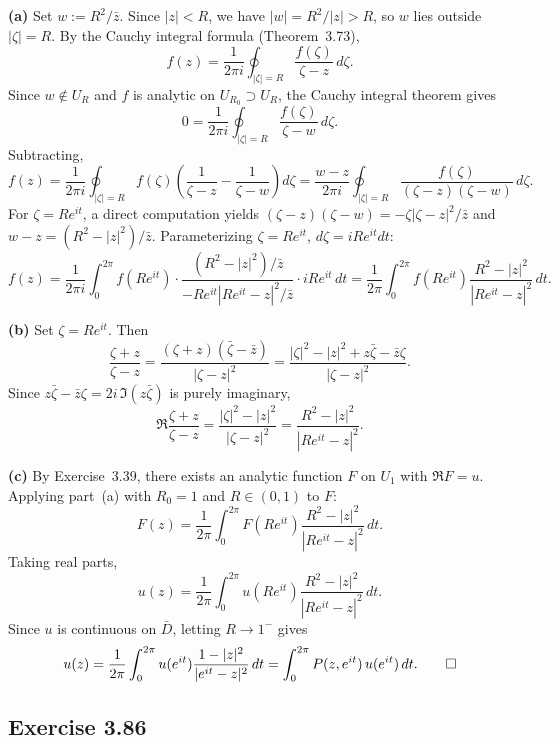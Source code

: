 \documentclass{article}
\begin{document}
\begin{solution}
  \textbf{(a)}\;
  Set $w := R^2/\bar{z}$.  Since $|z|<R$, we have
  $|w| = R^2/|z| > R$, so $w$ lies outside $|\zeta|=R$.
  By the Cauchy integral formula (Theorem~3.73),
  \[
    f(z) = \frac{1}{2\pi i}\oint_{|\zeta|=R}
    \frac{f(\zeta)}{\zeta - z}\,d\zeta.
  \]
  Since $w \notin U_R$ and $f$ is analytic on $U_{R_0}\supset U_R$,
  the Cauchy integral theorem gives
  \[
    0 = \frac{1}{2\pi i}\oint_{|\zeta|=R}
    \frac{f(\zeta)}{\zeta - w}\,d\zeta.
  \]
  Subtracting,
  \[
    f(z) = \frac{1}{2\pi i}\oint_{|\zeta|=R}f(\zeta)
    \left(\frac{1}{\zeta-z}-\frac{1}{\zeta-w}\right)d\zeta
    = \frac{w-z}{2\pi i}\oint_{|\zeta|=R}
    \frac{f(\zeta)}{(\zeta-z)(\zeta-w)}\,d\zeta.
  \]
  For $\zeta = Re^{it}$, a direct computation yields
  $(\zeta-z)(\zeta-w) = -\zeta|\zeta-z|^2/\bar{z}$ and
  $w-z = (R^2-|z|^2)/\bar{z}$.
  Parameterizing $\zeta = Re^{it}$, $d\zeta = iRe^{it}dt$:
  \[
    f(z) = \frac{1}{2\pi i}\int_0^{2\pi}
    f(Re^{it})\cdot
    \frac{(R^2-|z|^2)/\bar{z}}{-Re^{it}|Re^{it}-z|^2/\bar{z}}
    \cdot iRe^{it}\,dt
    = \frac{1}{2\pi}\int_0^{2\pi}
    f(Re^{it})\frac{R^2-|z|^2}{|Re^{it}-z|^2}\,dt.
  \]

  \medskip

  \textbf{(b)}\;
  Set $\zeta = Re^{it}$.  Then
  \[
    \frac{\zeta+z}{\zeta-z}
    = \frac{(\zeta+z)(\bar\zeta-\bar z)}{|\zeta-z|^2}
    = \frac{|\zeta|^2 - |z|^2 + z\bar\zeta - \bar z\zeta}
    {|\zeta-z|^2}.
  \]
  Since $z\bar\zeta-\bar z\zeta = 2i\,\Im(z\bar\zeta)$ is purely
  imaginary,
  \[
    \Re\frac{\zeta+z}{\zeta-z}
    = \frac{|\zeta|^2-|z|^2}{|\zeta-z|^2}
    = \frac{R^2-|z|^2}{|Re^{it}-z|^2}.
  \]

  \medskip

  \textbf{(c)}\;
  By Exercise~3.39, there exists an analytic function $F$ on
  $U_1$ with $\Re F = u$.
  Applying part~(a) with $R_0 = 1$ and $R \in (0,1)$ to $F$:
  \[
    F(z) = \frac{1}{2\pi}\int_0^{2\pi}
    F(Re^{it})\frac{R^2-|z|^2}{|Re^{it}-z|^2}\,dt.
  \]
  Taking real parts,
  \[
    u(z) = \frac{1}{2\pi}\int_0^{2\pi}
    u(Re^{it})\frac{R^2-|z|^2}{|Re^{it}-z|^2}\,dt.
  \]
  Since $u$ is continuous on $\bar{D}$, letting $R\to 1^-$ gives
  \[
    u(z) = \frac{1}{2\pi}\int_0^{2\pi}
    u(e^{it})\frac{1-|z|^2}{|e^{it}-z|^2}\,dt
    = \int_0^{2\pi}P(z,e^{it})\,u(e^{it})\,dt.\qedhere
  \]
\end{solution}

\subsection{Exercise 3.86}
\end{document}
